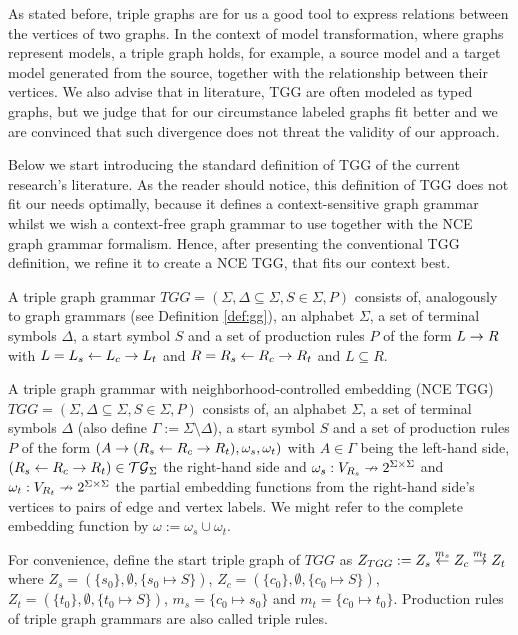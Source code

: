 As stated before, triple graphs are for us a good tool to express relations between the vertices of two graphs. In the context of model transformation, where graphs represent models, a triple graph holds, for example, a source model and a target model generated from the source, together with the relationship between their vertices. We also advise that in literature, TGG are often modeled as typed graphs, but we judge that for our circumstance labeled graphs fit better and we are convinced that such divergence does not threat the validity of our approach.

Below we start introducing the standard definition of TGG of the current research's literature. As the reader should notice, this definition of TGG does not fit our needs optimally, because it defines a context-sensitive graph grammar whilst we wish a context-free graph grammar to use together with the NCE graph grammar formalism. Hence, after presenting the conventional TGG definition, we refine it to create a NCE TGG, that fits our context best.

\begin{definition}
	\label{def:stgg}
	A triple graph grammar $TGG = (\Sigma, \Delta \subseteq \Sigma, S \in \Sigma, P)$ consists of, analogously to graph grammars (see Definition \ref{def:gg}), an alphabet $\Sigma$, a set of terminal symbols $\Delta$, a start symbol $S$ and a set of production rules $P$ of the form $L \to R$ with $L = L_s \overset{}{\leftarrow} L_c \overset{}{\rightarrow} L_t$ and $R = R_s \overset{}{\leftarrow} R_c \overset{}{\rightarrow} R_t$ and $L \subseteq R.$
\end{definition}

\begin{definition}
	\label{def:tgg}
	A triple graph grammar with neighborhood-controlled embedding (NCE TGG) $TGG = (\Sigma, \Delta \subseteq \Sigma, S \in \Sigma, P)$ consists of, an alphabet $\Sigma$, a set of terminal symbols $\Delta$ (also define $\Gamma := \Sigma \setminus \Delta$), a start symbol $S$ and a set of production rules $P$ of the form $(A \to (R_s \overset{}{\leftarrow} R_c \overset{}{\rightarrow} R_t), \omega_s, \omega_t)$ with $A \in \Gamma$ being the left-hand side, $(R_s \overset{}{\leftarrow} R_c \overset{}{\rightarrow} R_t) \in \mathcal{TG}_{\Sigma}$ the right-hand side and $\omega_s : V_{R_s} \nrightarrow 2^{\Sigma \times \Sigma}$ and $\omega_t : V_{R_t} \nrightarrow 2^{\Sigma \times \Sigma}$ the partial embedding functions from the right-hand side's vertices to pairs of edge and vertex labels. We might refer to the complete embedding function by $\omega:= \omega_s \cup \omega_t$.
	
	For convenience, define the start triple graph of $TGG$ as $Z_{TGG} := Z_s \overset{m_s}{\leftarrow} Z_c \overset{m_t}{\rightarrow} Z_t$ where $Z_s = (\{s_0\},\emptyset,\{s_0 \mapsto S\})$, $Z_c = (\{c_0\},\emptyset,\{c_0 \mapsto S\})$, $Z_t = (\{t_0\},\emptyset,\{t_0 \mapsto S\})$, $m_s = \{c_0 \mapsto s_0 \}$ and $m_t = \{c_0 \mapsto t_0 \}$. Production rules of triple graph grammars are also called triple rules.
	
\end{definition}

